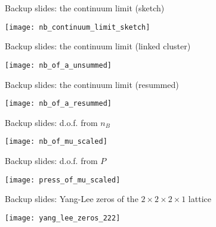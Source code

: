 \begin{frame}{Backup slides: the continuum limit (sketch)}

  \vspace{.5cm}
  \begin{center}
  \hspace*{-1cm}
    \texttt{[image: nb\_continuum\_limit\_sketch]}
  \end{center}
  
\end{frame}

\begin{frame}{Backup slides: the continuum limit (linked cluster)}

  \vspace{.25cm}
  \begin{center}
    \hspace*{-.5cm}
    \texttt{[image: nb\_of\_a\_unsummed]}
  \end{center}
  
\end{frame}

\begin{frame}{Backup slides: the continuum limit (resummed)}

  \vspace{.25cm}
  \begin{center}
    \hspace*{-.5cm}
    \texttt{[image: nb\_of\_a\_resummed]}
  \end{center}
  
\end{frame}

\begin{frame}{Backup slides: d.o.f. from $n_B$}

  \vspace{.25cm}
  \begin{center}
    \hspace*{-.5cm}
    \texttt{[image: nb\_of\_mu\_scaled]}
  \end{center}
  
\end{frame}

\begin{frame}{Backup slides: d.o.f. from $P$}

  \vspace{.5cm}
  \begin{center}
    \hspace*{-1cm}
    \texttt{[image: press\_of\_mu\_scaled]}
  \end{center}
  
\end{frame}

\begin{frame}{Backup slides: Yang-Lee zeros of the $2\times{}2\times{}2\times{}1$ lattice}

  \vspace{.5cm}
  \begin{center}
    \hspace*{-1cm}
    \texttt{[image: yang\_lee\_zeros\_222]}
  \end{center}
  
\end{frame}
